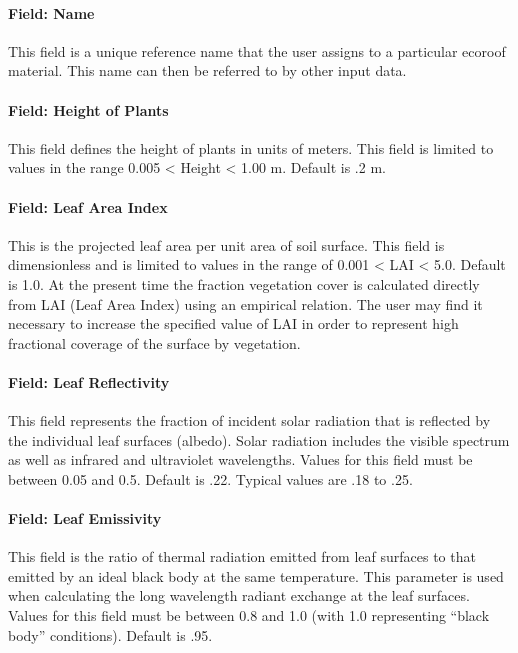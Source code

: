 \paragraph{Field: Name}\label{field-name-26-002}

This field is a unique reference name that the user assigns to a particular ecoroof material. This name can then be referred to by other input data.

\paragraph{Field: Height of Plants}\label{field-height-of-plants}

This field defines the height of plants in units of meters. This field is limited to values in the range 0.005 \textless{} Height \textless{} 1.00 m. Default is .2 m.

\paragraph{Field: Leaf Area Index}\label{field-leaf-area-index}

This is the projected leaf area per unit area of soil surface. This field is dimensionless and is limited to values in the range of 0.001 \textless{} LAI \textless{} 5.0. Default is 1.0. At the present time the fraction vegetation cover is calculated directly from LAI (Leaf Area Index) using an empirical relation. The user may find it necessary to increase the specified value of LAI in order to represent high fractional coverage of the surface by vegetation.

\paragraph{Field: Leaf Reflectivity}\label{field-leaf-reflectivity}

This field represents the fraction of incident solar radiation that is reflected by the individual leaf surfaces (albedo). Solar radiation includes the visible spectrum as well as infrared and ultraviolet wavelengths. Values for this field must be between 0.05 and 0.5. Default is .22. Typical values are .18 to .25.

\paragraph{Field: Leaf Emissivity}\label{field-leaf-emissivity}

This field is the ratio of thermal radiation emitted from leaf surfaces to that emitted by an ideal black body at the same temperature. This parameter is used when calculating the long wavelength radiant exchange at the leaf surfaces. Values for this field must be between 0.8 and 1.0 (with 1.0 representing ``black body'' conditions). Default is .95.

